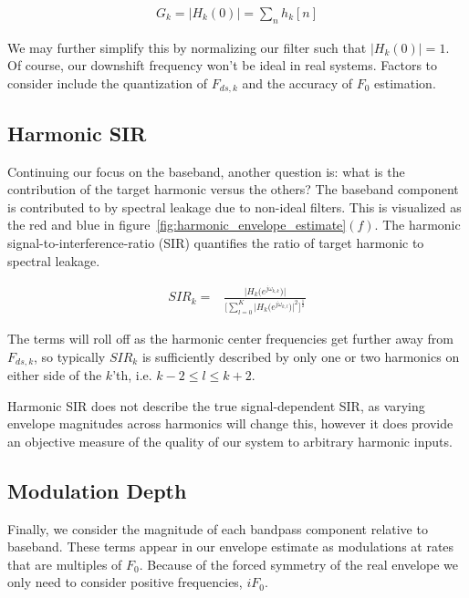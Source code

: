 \documentclass [11pt, proquest] {uwthesis}[2015/03/03]
\begin{document}
\begin{align}
G_k = \Big| H_k(0) \Big| = \sum_n h_k[n]
\end{align}

We may further simplify this by normalizing our filter such that $\Big| H_k(0) \Big| = 1$.  Of course, our downshift frequency won't be ideal in real systems.  Factors to consider include the quantization of $F_{ds,k}$ and the accuracy of $F_0$ estimation.

\subsection{Harmonic SIR}

Continuing our focus on the baseband, another question is: what is the contribution of the target harmonic versus the others?  The baseband component is contributed to by spectral leakage due to non-ideal filters.  This is visualized as the red and blue in figure~\ref{fig:harmonic_envelope_estimate}$(f)$.  The harmonic signal-to-interference-ratio (SIR) quantifies the ratio of target harmonic to spectral leakage.

\begin{align}
SIR_k =& \frac{\Big| H_k\big(e^{j\omega_{k,k}}\big) \Big|} {\Bigg[ \sum\limits_{l=0}^K \Big|H_k\big(e^{j\omega_{k,l}}\big)\Big|^2 \Bigg] ^ \frac{1}{2}}
\end{align}

The terms will roll off as the harmonic center frequencies get further away from $F_{ds,k}$, so typically $SIR_k$ is sufficiently described by only one or two harmonics on either side of the $k$'th, i.e. $k-2 \leq l \leq k+2$.

Harmonic SIR does not describe the true signal-dependent SIR, as varying envelope magnitudes across harmonics will change this, however it does provide an objective measure of the quality of our system to arbitrary harmonic inputs.


\subsection{Modulation Depth}

Finally, we consider the magnitude of each bandpass component relative to baseband.  These terms appear in our envelope estimate as modulations at rates that are multiples of $F_0$.  Because of the forced symmetry of the real envelope we only need to consider positive frequencies, $iF_0$.
\end{document}
